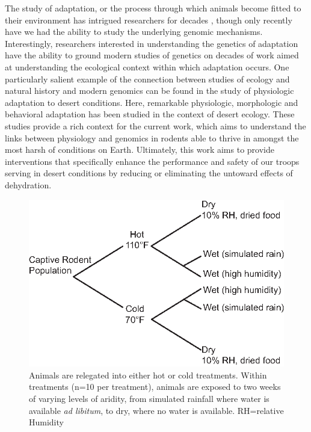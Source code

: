 \documentclass[12pt]{article}
\begin{document}
The study of adaptation, or the process through which animals become fitted to their environment has intrigued researchers for decades \citep{Darwin:1859tm, Fisher:1930wy}, though only recently have we had the ability to study the underlying genomic mechanisms. Interestingly, researchers interested in understanding the genetics of adaptation have the ability to ground modern studies of genetics on decades of work aimed at understanding the ecological context within which adaptation occurs. One particularly salient example of the connection between studies of ecology and natural history and modern genomics can be found in the study of physiologic adaptation to desert conditions. Here, remarkable physiologic, morphologic \citep{Dickinson:2007jn,Huntley:1984us,SchmidtNielsen:1950wg,SchmidtNielsen:1952wp} and behavioral \citep{NAGY:1994vd} adaptation has been studied in the context of desert ecology. These studies provide a rich context for the current work, which aims to understand the links between physiology and genomics in rodents able to thrive in amongst the most harsh of conditions on Earth. Ultimately, this work aims to provide interventions that specifically enhance the performance and safety of our troops serving in desert conditions by reducing or eliminating the untoward effects of dehydration.

\begin{figure}
\hypertarget{Figure 1}{}
\vspace{-5mm}
\begin{mdframed}
  \begin{center}
    \includegraphics[width=1\textwidth]{exp_design_fig.eps}
  \end{center}
  \caption{\small{Animals are relegated into either hot or cold treatments. Within treatments (n=10 per treatment), animals are exposed to two weeks of varying levels of aridity, from simulated rainfall where water is available \textit{ad libitum}, to dry, where no water is available. RH=relative Humidity}}
\end{mdframed}
\end{figure}
\end{document}
